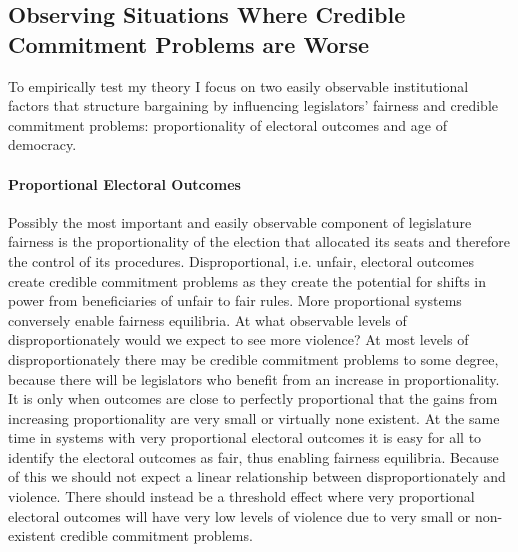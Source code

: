 \documentclass[a4paper]{article}\usepackage[]{graphicx}\usepackage[]{color}
\begin{document}
\subsection{Observing Situations Where Credible Commitment Problems are Worse}

To empirically test my theory I focus on two easily observable institutional factors that structure bargaining by influencing legislators' fairness and credible commitment problems: proportionality of electoral outcomes and age of democracy.

\paragraph{Proportional Electoral Outcomes}

Possibly the most important and easily observable component of legislature fairness is the proportionality of the election that allocated its seats and therefore the control of its procedures. Disproportional, i.e. unfair, electoral outcomes create credible commitment problems as they create the potential for shifts in power from beneficiaries of unfair to fair rules. More proportional systems conversely enable fairness equilibria. At what observable levels of disproportionately would we expect to see more violence? At most levels of disproportionately there may be credible commitment problems to some degree, because there will be legislators who benefit from an increase in proportionality. It is only when outcomes are close to perfectly proportional that the gains from increasing proportionality are very small or virtually none existent. At the same time in systems with very proportional electoral outcomes it is easy for all to identify the electoral outcomes as fair, thus enabling fairness equilibria. Because of this we should not expect a linear relationship between disproportionately and violence. There should instead be a threshold effect where very proportional electoral outcomes will have very low levels of violence due to very small or non-existent credible commitment problems. 
\end{document}
